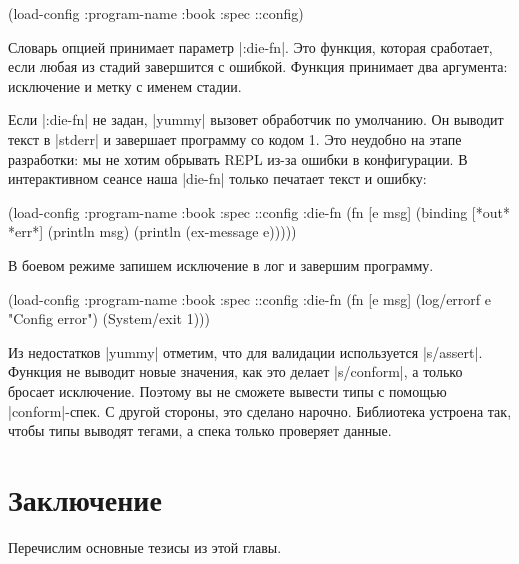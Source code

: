 \begin{english}
  \begin{clojure}
(load-config {:program-name :book
              :spec ::config})
  \end{clojure}
\end{english}

Словарь опцией принимает параметр \spverb|:die-fn|. Это функция, которая
сработает, если любая из стадий завершится с ошибкой. Функция принимает два
аргумента: исключение и метку с именем стадии.

Если \spverb|:die-fn| не задан, \spverb|yummy| вызовет обработчик по
умолчанию. Он выводит текст в \spverb|stderr| и завершает программу со кодом
1. Это неудобно на этапе разработки: мы не хотим обрывать REPL из-за ошибки в
конфигурации. В интерактивном сеансе наша \spverb|die-fn| только печатает текст
и ошибку:

\begin{english}
  \begin{clojure}
(load-config
 {:program-name :book
  :spec ::config
  :die-fn (fn [e msg]
            (binding [*out* *err*]
              (println msg)
              (println (ex-message e))))})
  \end{clojure}
\end{english}

В боевом режиме запишем исключение в лог и завершим программу.

\begin{english}
  \begin{clojure}
(load-config
 {:program-name :book
  :spec ::config
  :die-fn (fn [e msg]
            (log/errorf e "Config error")
            (System/exit 1))})
  \end{clojure}
\end{english}

Из недостатков \spverb|yummy| отметим, что для валидации используется
\spverb|s/assert|. Функция не выводит новые значения, как это делает
\spverb|s/conform|, а только бросает исключение. Поэтому вы не сможете вывести
типы с помощью \spverb|conform|-спек. С другой стороны, это сделано
нарочно. Библиотека устроена так, чтобы типы выводят тегами, а спека только
проверяет данные.

\section{Заключение}

Перечислим основные тезисы из этой главы.

